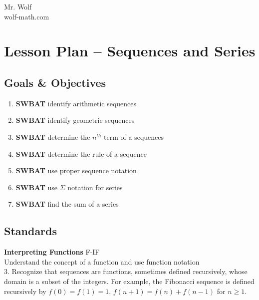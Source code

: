 \documentclass[12pt]{article}
\begin{document}
\newcommand{\random}{\rand\arabic{rand}}



Mr. Wolf\\
wolf-math.com\\

\section{Lesson Plan -- Sequences and Series}


\subsection{Goals \& Objectives}

\begin{enumerate}

\item \textbf{SWBAT} identify arithmetic sequences 

\item \textbf{SWBAT} identify geometric sequences 

\item \textbf{SWBAT} determine the $n^{th}$ term of a sequences

\item \textbf{SWBAT} determine the rule of a sequence

\item \textbf{SWBAT} use proper sequence notation

\item \textbf{SWBAT} use $\Sigma$ notation for series

\item \textbf{SWBAT} find the sum of a series

\end{enumerate}

\subsection{Standards}

\textbf{Interpreting Functions } \hfill F-IF\\

Understand the concept of a function and use function notation\\

3.	 Recognize that sequences are functions, sometimes defined
recursively, whose domain is a subset of the integers. For example, the
Fibonacci sequence is defined recursively by $f(0) = f(1) = 1$, $f(n+1) = f(n) +
f(n-1)$ for $n ≥ 1$.\\
\end{document}
